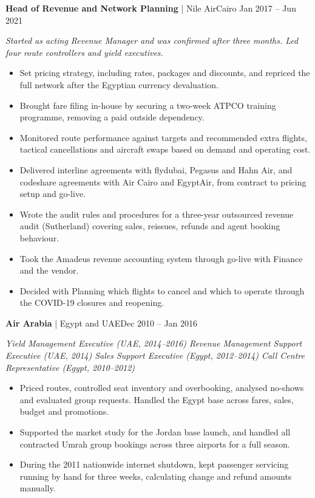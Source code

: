 \documentclass[10pt,a4paper]{article}
\newcommand{\role}[3]{\vspace{5pt}\needspace{3\baselineskip}\textbf{#1}\,\,|\,\,#2\hfill{\small\color{muted}#3}\par}
\newcommand{\rolenote}[1]{{\small\itshape\color{muted}#1}\par}
\begin{document}
\role{Head of Revenue and Network Planning}{Nile Air}{Cairo \textperiodcentered{} Jan 2017 -- Jun 2021}
\rolenote{Started as acting Revenue Manager and was confirmed after three months. Led four route controllers and yield executives.}
\begin{itemize}
  \item Set pricing strategy, including rates, packages and discounts, and repriced the full network after the Egyptian currency devaluation.
  \item Brought fare filing in-house by securing a two-week ATPCO training programme, removing a paid outside dependency.
  \item Monitored route performance against targets and recommended extra flights, tactical cancellations and aircraft swaps based on demand and operating cost.
  \item Delivered interline agreements with flydubai, Pegasus and Hahn Air, and codeshare agreements with Air Cairo and EgyptAir, from contract to pricing setup and go-live.
  \item Wrote the audit rules and procedures for a three-year outsourced revenue audit (Sutherland) covering sales, reissues, refunds and agent booking behaviour.
  \item Took the Amadeus revenue accounting system through go-live with Finance and the vendor.
  \item Decided with Planning which flights to cancel and which to operate through the COVID-19 closures and reopening.
\end{itemize}

\role{Air Arabia}{Egypt and UAE}{Dec 2010 -- Jan 2016}
\rolenote{Yield Management Executive (UAE, 2014--2016)  \textperiodcentered{}  Revenue Management Support Executive (UAE, 2014)  \textperiodcentered{}  Sales Support Executive (Egypt, 2012--2014)  \textperiodcentered{}  Call Centre Representative (Egypt, 2010--2012)}
\begin{itemize}
  \item Priced routes, controlled seat inventory and overbooking, analysed no-shows and evaluated group requests. Handled the Egypt base across fares, sales, budget and promotions.
  \item Supported the market study for the Jordan base launch, and handled all contracted Umrah group bookings across three airports for a full season.
  \item During the 2011 nationwide internet shutdown, kept passenger servicing running by hand for three weeks, calculating change and refund amounts manually.
\end{itemize}
\end{document}
